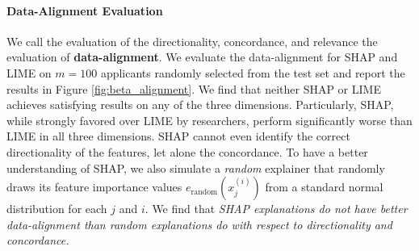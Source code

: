 \documentclass[mnsc,blindrev]{informs3}
\begin{document}
   
        




 \paragraph{Data-Alignment Evaluation}
  We call the evaluation of the directionality, concordance, and relevance the evaluation of \textbf{data-alignment}. We evaluate the data-alignment
 for SHAP and LIME on $m=100$ applicants randomly selected from the test set and report the results in Figure \ref{fig:beta_alignment}. 
 We find that neither SHAP or LIME achieves satisfying results on any of the three dimensions. Particularly, SHAP, while strongly favored over LIME by researchers, perform significantly worse than LIME in all three dimensions. SHAP cannot even identify the correct directionality of the features, let alone the concordance. To have a better understanding of SHAP, we also simulate a \emph{random} explainer that randomly draws its feature importance values $e_\text{random}(x^{(i)}_j)$ from a standard normal distribution for each $j$ and $i$. We find that \emph{SHAP explanations do not have better data-alignment than random explanations do with respect to directionality and concordance.}         
\end{document}
